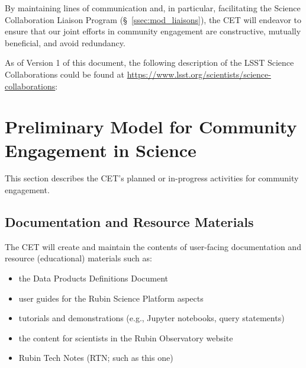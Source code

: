 \documentclass[DM,lsstdraft,toc]{lsstdoc}
\begin{document}
By maintaining lines of communication and, in particular, facilitating the Science Collaboration Liaison Program (\S~\ref{ssec:mod_liaisons}), the CET will endeavor to ensure that our joint efforts in community engagement are constructive, mutually beneficial, and avoid redundancy.

As of Version 1 of this document, the following description of the LSST Science Collaborations could be found at \url{https://www.lsst.org/scientists/science-collaborations}:


\section{Preliminary Model for Community Engagement in Science}\label{sec:mod}

This section describes the CET's planned or in-progress activities for community engagement. 


\subsection{Documentation and Resource Materials}\label{ssec:mod_docs}

The CET will create and maintain the contents of user-facing documentation and resource (educational) materials such as:
\begin{itemize}
\item the Data Products Definitions Document 
\item user guides for the Rubin Science Platform aspects
\item tutorials and demonstrations (e.g., Jupyter notebooks, query statements)
\item the content for scientists in the Rubin Observatory website
\item Rubin Tech Notes (RTN; such as this one)
\end{itemize}
\end{document}
